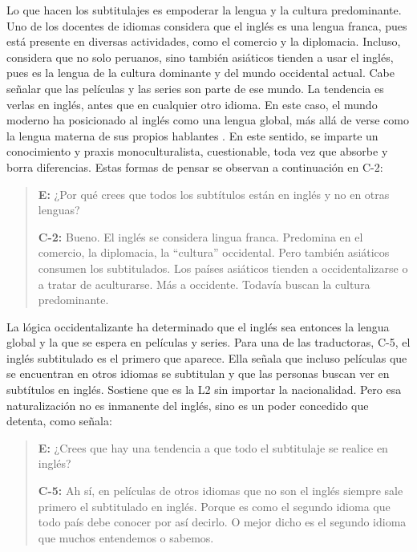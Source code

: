 \documentclass[spanish]{textolivre}
\newenvironment{MyQuote}{%
    \begin{myQuoteEnumerate}[resume=*,series=MyQuoteSeries]%
    \item \begin{quote}%
}{%
    \end{quote}%
    \end{myQuoteEnumerate}%
}%
\begin{document}
Lo que hacen los subtitulajes es empoderar la lengua y la cultura predominante. Uno de los docentes de idiomas considera que el inglés es una lengua franca, pues está presente en diversas actividades, como el comercio y la diplomacia. Incluso, considera que no solo peruanos, sino también asiáticos tienden a usar el inglés, pues es la lengua de la cultura dominante y del mundo occidental actual. Cabe señalar que las películas y las series son parte de ese mundo. La tendencia es verlas en inglés, antes que en cualquier otro idioma. En este caso, el mundo moderno ha posicionado al inglés como una lengua global, más allá de verse como la lengua materna de sus propios hablantes \cite{garrido2010lengua}. En este sentido, se imparte un conocimiento y praxis monoculturalista, cuestionable, toda vez que absorbe y borra diferencias. Estas formas de pensar se observan a continuación en C-2:

\begin{MyQuote}\label{myquote03}
\textbf{E:} ¿Por qué crees que todos los subtítulos están en inglés y no en otras lenguas?

\textbf{C-2:} Bueno. El inglés se considera lingua franca. Predomina en el comercio, la diplomacia, la “cultura” occidental. Pero también asiáticos consumen los subtitulados. Los países asiáticos tienden a occidentalizarse o a tratar de aculturarse. Más a occidente. Todavía buscan la cultura predominante.
\end{MyQuote}

La lógica occidentalizante ha determinado que el inglés sea entonces la lengua global y la que se espera en películas y series. Para una de las traductoras, C-5, el inglés subtitulado es el primero que aparece. Ella señala que incluso películas que se encuentran en otros idiomas se subtitulan y que las personas buscan ver en subtítulos en inglés. Sostiene que es la L2 sin importar la nacionalidad. Pero esa naturalización no es inmanente del inglés, sino es un poder concedido que detenta, como señala:

\begin{MyQuote}\label{myquote04}
\textbf{E:} ¿Crees que hay una tendencia a que todo el subtitulaje se realice en inglés?

\textbf{C-5:} Ah sí, en películas de otros idiomas que no son el inglés siempre sale primero el subtitulado en inglés. Porque es como el segundo idioma que todo país debe conocer por así decirlo. O mejor dicho es el segundo idioma que muchos entendemos o sabemos.
\end{MyQuote}
\end{document}
